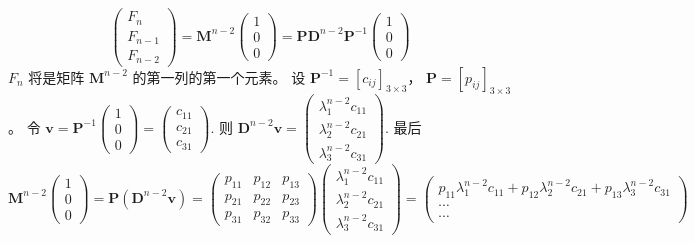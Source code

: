 \documentclass{article}
\begin{document}
$$ \begin{pmatrix} F_n \\ F_{n-1} \\ F_{n-2} \end{pmatrix} = \mathbf{M}^{n-2} \begin{pmatrix} 1 \\ 0 \\ 0 \end{pmatrix} = \mathbf{P} \mathbf{D}^{n-2} \mathbf{P}^{-1} \begin{pmatrix} 1 \\ 0 \\ 0 \end{pmatrix} $$
$F_n$ 将是矩阵 $\mathbf{M}^{n-2}$ 的第一列的第一个元素。  设 $\mathbf{P}^{-1} = [c_{ij}]_{3\times 3}$， $\mathbf{P} = [p_{ij}]_{3\times 3}$。
令 $\mathbf{v} = \mathbf{P}^{-1} \begin{pmatrix} 1 \\ 0 \\ 0 \end{pmatrix} = \begin{pmatrix} c_{11} \\ c_{21} \\ c_{31} \end{pmatrix}$.
则 $\mathbf{D}^{n-2} \mathbf{v} = \begin{pmatrix} \lambda_1^{n-2} c_{11} \\ \lambda_2^{n-2} c_{21} \\ \lambda_3^{n-2} c_{31} \end{pmatrix}$.
最后 $\mathbf{M}^{n-2} \begin{pmatrix} 1 \\ 0 \\ 0 \end{pmatrix} = \mathbf{P} (\mathbf{D}^{n-2} \mathbf{v}) = \begin{pmatrix} p_{11} & p_{12} & p_{13} \\ p_{21} & p_{22} & p_{23} \\ p_{31} & p_{32} & p_{33} \end{pmatrix} \begin{pmatrix} \lambda_1^{n-2} c_{11} \\ \lambda_2^{n-2} c_{21} \\ \lambda_3^{n-2} c_{31} \end{pmatrix} = \begin{pmatrix} p_{11} \lambda_1^{n-2} c_{11} + p_{12} \lambda_2^{n-2} c_{21} + p_{13} \lambda_3^{n-2} c_{31} \\ \cdots \\ \cdots \end{pmatrix}$
\end{document}
